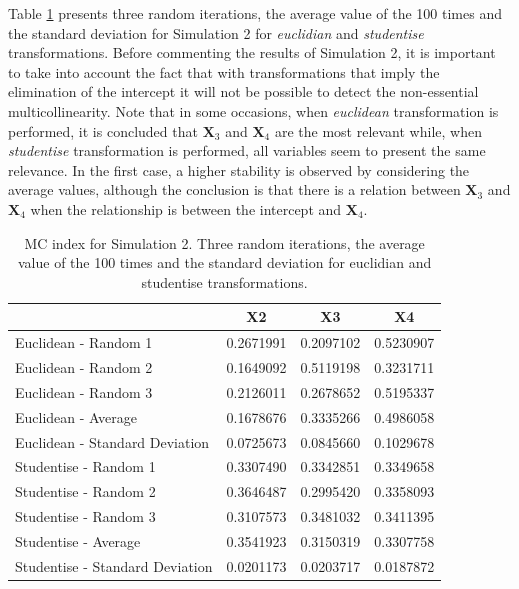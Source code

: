 Table \ref{tab:Simulation2randomlatex} presents three random iterations, the average value of the 100 times and the standard deviation for Simulation 2 for \emph{euclidian} and \emph{studentise} transformations. Before commenting the results of Simulation 2, it is important to take into account the fact that with transformations that imply the elimination of the intercept it will not be possible to detect the non-essential multicollinearity.
Note that in some occasions, when \emph{euclidean} transformation is performed, it is concluded that \(\mathbf{X}_{3}\) and \(\mathbf{X}_{4}\) are the most relevant while, when \emph{studentise} transformation is performed, all variables seem to present the same relevance. In the first case, a higher stability is observed by considering the average values, although the conclusion is that there is a relation between \(\mathbf{X}_{3}\) and \(\mathbf{X}_{4}\) when the relationship is between the intercept and \(\mathbf{X}_{4}\).

\begin{table}

\caption{\label{tab:Simulation2randomlatex}MC index for Simulation 2. Three random iterations, the average value of the 100 times and the standard deviation for euclidian and studentise transformations.}
\centering
\begin{tabular}[t]{l|c|c|c}
\hline
  & X2 & X3 & X4\\
\hline
Euclidean - Random 1 & 0.2671991 & 0.2097102 & 0.5230907\\
\hline
Euclidean - Random 2 & 0.1649092 & 0.5119198 & 0.3231711\\
\hline
Euclidean - Random 3 & 0.2126011 & 0.2678652 & 0.5195337\\
\hline
Euclidean - Average & 0.1678676 & 0.3335266 & 0.4986058\\
\hline
Euclidean - Standard Deviation & 0.0725673 & 0.0845660 & 0.1029678\\
\hline
Studentise - Random 1 & 0.3307490 & 0.3342851 & 0.3349658\\
\hline
Studentise - Random 2 & 0.3646487 & 0.2995420 & 0.3358093\\
\hline
Studentise - Random 3 & 0.3107573 & 0.3481032 & 0.3411395\\
\hline
Studentise - Average & 0.3541923 & 0.3150319 & 0.3307758\\
\hline
Studentise - Standard Deviation & 0.0201173 & 0.0203717 & 0.0187872\\
\hline
\end{tabular}
\end{table}

